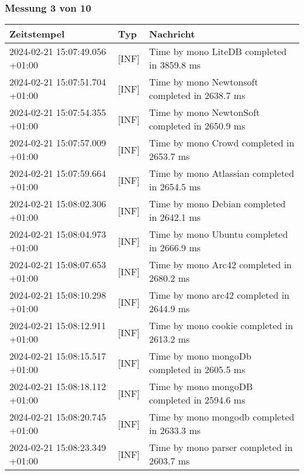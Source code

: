     \subsubsection*{Messung 3 von 10} \label{subsubsec:LiteDbMehrPaketeAlsDb3von10}
        {
            {\small
                \begin{tabularx}{\textwidth}{|l|l|X|}
                    \hline
                    \textbf{Zeitstempel} & \textbf{Typ} & \textbf{Nachricht} \\
                    \hline
                    \endhead
                    2024-02-21 15:07:49.056 +01:00 & [INF] & Time by mono LiteDB completed in 3859.8 ms \\
                    2024-02-21 15:07:51.704 +01:00 & [INF] & Time by mono Newtonsoft completed in 2638.7 ms \\
                    2024-02-21 15:07:54.355 +01:00 & [INF] & Time by mono NewtonSoft completed in 2650.9 ms \\
                    2024-02-21 15:07:57.009 +01:00 & [INF] & Time by mono Crowd completed in 2653.7 ms \\
                    2024-02-21 15:07:59.664 +01:00 & [INF] & Time by mono Atlassian completed in 2654.5 ms \\
                    2024-02-21 15:08:02.306 +01:00 & [INF] & Time by mono Debian completed in 2642.1 ms \\
                    2024-02-21 15:08:04.973 +01:00 & [INF] & Time by mono Ubuntu completed in 2666.9 ms \\
                    2024-02-21 15:08:07.653 +01:00 & [INF] & Time by mono Arc42 completed in 2680.2 ms \\
                    2024-02-21 15:08:10.298 +01:00 & [INF] & Time by mono arc42 completed in 2644.9 ms \\
                    2024-02-21 15:08:12.911 +01:00 & [INF] & Time by mono cookie completed in 2613.2 ms \\
                    2024-02-21 15:08:15.517 +01:00 & [INF] & Time by mono mongoDb completed in 2605.5 ms \\
                    2024-02-21 15:08:18.112 +01:00 & [INF] & Time by mono mongoDB completed in 2594.6 ms \\
                    2024-02-21 15:08:20.745 +01:00 & [INF] & Time by mono mongodb completed in 2633.3 ms \\
                    2024-02-21 15:08:23.349 +01:00 & [INF] & Time by mono parser completed in 2603.7 ms \\

\end{tabularx}}}
